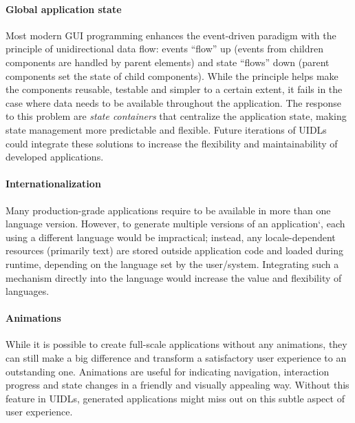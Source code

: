 
\paragraph{Global application state}
Most modern GUI programming enhances the event-driven paradigm with the principle of unidirectional data flow: events \enquote{flow} up (events from children components are handled by parent elements) and state \enquote{flows} down (parent components set the state of child components).
While the principle helps make the components reusable, testable and simpler to a certain extent, it fails in the case where data needs to be available throughout the application.
The response to this problem are \emph{state containers} that centralize the application state, making state management more predictable and flexible.
Future iterations of UIDLs could integrate these solutions to increase the flexibility and maintainability of developed applications.

\paragraph{Internationalization}
Many production-grade applications require to be available in more than one language version.
However, to generate multiple versions of an application`, each using a different language would be impractical;
instead, any locale-dependent resources (primarily text) are stored outside application code and loaded during runtime, depending on the language set by the user/system.
Integrating such a mechanism directly into the language would increase the value and flexibility of languages.


\paragraph{Animations}
While it is possible to create full-scale applications without any animations, they can still make a big difference and transform a satisfactory user experience to an outstanding one.
Animations are useful for indicating navigation, interaction progress and state changes in a friendly and visually appealing way.
Without this feature in UIDLs, generated applications might miss out on this subtle aspect of user experience.

